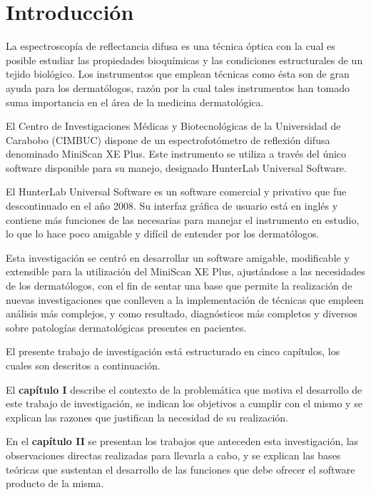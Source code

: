\chapter*{Introducci\'{o}n}


	La espectroscop\'{i}a de reflectancia difusa es una t\'{e}cnica \'{o}ptica con la cual es  posible estudiar las propiedades bioqu\'{i}micas y las condiciones estructurales de un tejido biol\'{o}gico. Los instrumentos que emplean t\'{e}cnicas como \'{e}sta son de gran ayuda para los dermat\'{o}logos, raz\'{o}n por la cual tales instrumentos han tomado suma importancia en el \'{a}rea de la medicina dermatol\'{o}gica.

El Centro de Investigaciones M\'{e}dicas y Biotecnol\'{o}gicas de la Universidad de Carabobo (CIMBUC) dispone de un espectrofot\'{o}metro de reflexi\'{o}n difusa denominado MiniScan XE Plus. Este instrumento se utiliza a trav\'{e}s del \'{u}nico software disponible para su manejo, designado HunterLab Universal Software.

El HunterLab Universal Software es un software comercial y privativo que fue descontinuado en el a\~{n}o 2008. Su interfaz gr\'{a}fica de usuario est\'{a} en ingl\'{e}s y contiene m\'{a}s funciones de las necesarias para manejar el instrumento en estudio, lo que lo hace poco amigable y dif\'{i}cil de entender por los dermat\'{o}logos.

Esta investigaci\'{o}n se centr\'{o} en desarrollar un software amigable, modificable y extensible para la utilizaci\'{o}n del MiniScan XE Plus, ajust\'{a}ndose a las necesidades de los dermat\'{o}logos, con el fin de sentar una base que permite la realizaci\'{o}n de nuevas investigaciones que conlleven a la implementaci\'{o}n de t\'{e}cnicas que empleen an\'{a}lisis m\'{a}s complejos, y como resultado, diagn\'{o}sticos m\'{a}s completos y diversos sobre patolog\'{i}as dermatol\'{o}gicas presentes en pacientes.

\newpage
\thispagestyle{plain}
	El presente trabajo de investigaci\'{o}n est\'{a} estructurado en cinco cap\'{i}tulos, los cuales son descritos a continuaci\'{o}n.

	El \textbf{cap\'{i}tulo I} describe el contexto de la problem\'{a}tica que motiva el desarrollo de este trabajo de investigaci\'{o}n, se indican los objetivos a cumplir con el mismo y se explican las razones que justifican la necesidad de su realizaci\'{o}n.

	En el \textbf{cap\'{i}tulo II} se presentan los trabajos que anteceden esta investigaci\'{o}n, las observaciones directas realizadas para llevarla a cabo, y se explican las bases te\'{o}ricas que sustentan el desarrollo de las funciones que debe ofrecer el software producto de la misma.

